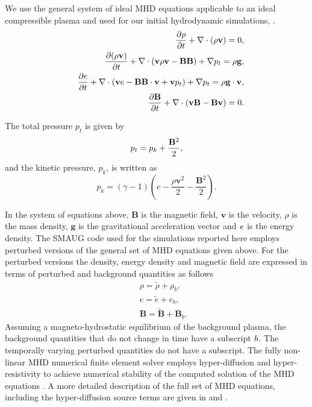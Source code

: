 \documentclass[physics,article,submit,pdftex,moreauthors]{Definitions/mdpi}
\begin{document}
We use the 
general system of ideal MHD equations applicable to an ideal compressible plasma and used for our initial hydrodynamic simulations, \cite{Griffiths2018b}.
\begin{eqnarray}
&& {{\partial \rho}\over{\partial t}}+\nabla\cdot\left( \rho{\mathbf v}\right)=0, \label{e1} \\
&& {{\partial ( \rho {\bf v})}\over{\partial t}}+\nabla\cdot\left( {\bf v}\rho {\bf v}-{\bf B B}\right)+\nabla p_t=\rho{\bf g}, \label{e2}\\
&& \frac{\partial e}{\partial t}+\nabla\cdot\left({\bf v}e-{\bf B B}\cdot{\bf v}+{\bf v}p_{t}\right)+\nabla p_t=\rho{\bf g}\cdot{\bf v}, \label{e3} \\
&& {{\partial{\bf B}}\over{\partial t}} +\nabla \cdot\left(  {\bf vB}-{\bf Bv}\right)=0. \label{e4}
\end{eqnarray}

\noindent
The total pressure $p_{t}$ is given by
\begin{equation}
p_{t}=p_{k}+{{\bf B}^{2}\over{2}}, \label{e5}
\end{equation}
and the kinetic pressure, $p_k$, is written as
\begin{equation}
p_{k}=\left(\gamma -1\right)\left(e-\frac{\rho {\mathbf v}^{2}}{2}-\frac{{\mathbf B}^{2}}{2}\right). \label{e6}
\end{equation}

In the system of equations above,  $\mathbf B$ is the magnetic field, $\mathbf v$ is the velocity, $\rho$ is the mass density, $\mathbf g$ is the gravitational acceleration vector  and  $\it{e}$ is the energy density. The SMAUG code used for the simulations reported here employs perturbed versions of the general set of MHD equations given above. For the perturbed versions the density,  energy density and magnetic field are expressed in terms of perturbed and background quantities as follows
\begin{eqnarray}
&& \rho = \tilde{\rho}+\rho_b, \nonumber \\
&& e = \tilde{e}+e_b,  \nonumber \\
&& {\mathbf B} = \tilde{\mathbf B}+{\mathbf B}_b.  \nonumber 
\end{eqnarray}
Assuming a magneto-hydrostatic equilibrium of the background plasma, the background quantities that do not change in time have a subscript $\it{b}$. The temporally varying perturbed quantities do not have a subscript. The fully non-linear MHD numerical finite element solver employs hyper-diffusion and hyper-resistivity to achieve numerical stability of the computed solution of the MHD equations \cite{Caunt2001}. A more detailed description of the full set of MHD equations, including the hyper-diffusion source terms are given in \cite{Griffiths2015} and \cite{Shelyag2008}.
\end{document}
